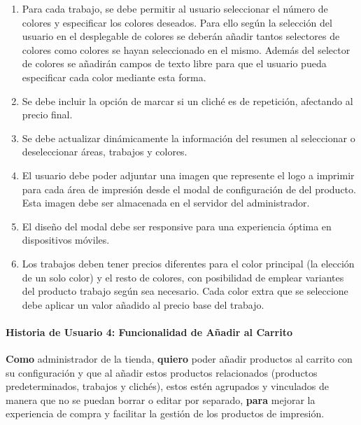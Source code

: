 \documentclass[11pt]{article}
\newcommand{\subsubsubsection}[1]{\paragraph{#1}}
\begin{document}
\begin{enumerate}[label=\arabic*.]
    \item Para cada trabajo, se debe permitir al usuario seleccionar el número de colores y especificar los colores deseados. Para ello según la selección del usuario en el desplegable de colores se deberán añadir tantos selectores de colores como colores se hayan seleccionado en el mismo. Además del selector de colores se añadirán campos de texto libre para que el usuario pueda especificar cada color mediante esta forma.
    \item Se debe incluir la opción de marcar si un cliché es de repetición, afectando al precio final.
    \item Se debe actualizar dinámicamente la información del resumen al seleccionar o deseleccionar áreas, trabajos y colores.
    \item El usuario debe poder adjuntar una imagen que represente el logo a imprimir para cada área de impresión desde el modal de configuración de del producto. Esta imagen debe ser almacenada en el servidor del administrador.
    \item El diseño del modal debe ser responsive para una experiencia óptima en dispositivos móviles.
    \item Los trabajos deben tener precios diferentes para el color principal (la elección de un solo color) y el resto de colores, con posibilidad de emplear variantes del producto trabajo según sea necesario. Cada color extra que se seleccione debe aplicar un valor añadido al precio base del trabajo.
\end{enumerate}


\subsubsubsection{Historia de Usuario 4: Funcionalidad de Añadir al Carrito}\label{sec:historia4}

\textbf{Como} administrador de la tienda,
\textbf{quiero} poder añadir productos al carrito con su configuración y que al añadir estos productos relacionados (productos predeterminados, trabajos y clichés), estos estén agrupados y vinculados de manera que no se puedan borrar o editar por separado,
\textbf{para} mejorar la experiencia de compra y facilitar la gestión de los productos de impresión.
\end{document}
